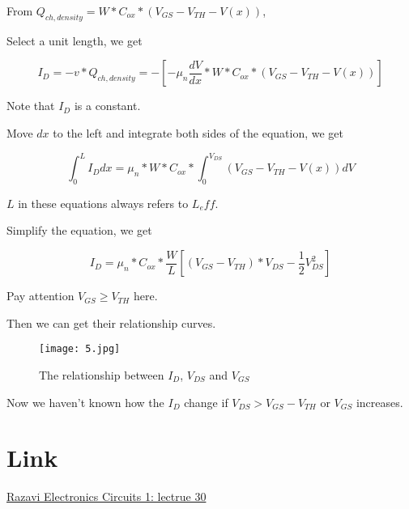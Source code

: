 \documentclass[fontset=windows]{article}
\begin{document}
From $Q_{ch,density}=W*C_{ox}*(V_{GS}-V_{TH}-V(x))$,

Select a unit length, we get

$$I_D=-v*Q_{ch,density}=-[-\mu_{n}\frac{dV}{dx}*W*C_{ox}*(V_{GS}-V_{TH}-V(x))]$$

Note that $I_D$ is a constant.

Move $dx$ to the left and integrate both sides of the equation, we get

$$\int_{0}^{L} I_Ddx=\mu_{n}*W*C_{ox}*\int_{0}^{V_{DS}} (V_{GS}-V_{TH}-V(x))dV$$

$L$ in these equations always refers to $L_eff$.

Simplify the equation, we get

$$I_D=\mu_{n}*C_{ox}*\frac{W}{L}[(V_{GS}-V_{TH})*V_{DS}-\frac{1}{2}V_{DS}^2]$$

Pay attention $V_{GS} \geq V_{TH}$ here.

Then we can get their relationship curves.

\begin{figure}[htbp]
    \centering
    \texttt{[image: 5.jpg]}
    \captionsetup{labelformat=empty}
    \caption{The relationship between $I_D$, $V_{DS}$ and $V_{GS}$}
    \label{5}
\end{figure}

Now we haven't known how the $I_D$ change if $V_{DS}>V_{GS}-V_{TH}$ or $V_{GS}$ increases.

\section*{Link}

\href{https://www.bilibili.com/video/BV1FD4y1R7Ah?p=30&vd_source=1d0c07486a3bd3b0adb8ac548bf6453e}{Razavi Electronics Circuits 1: lectrue 30}
\end{document}
